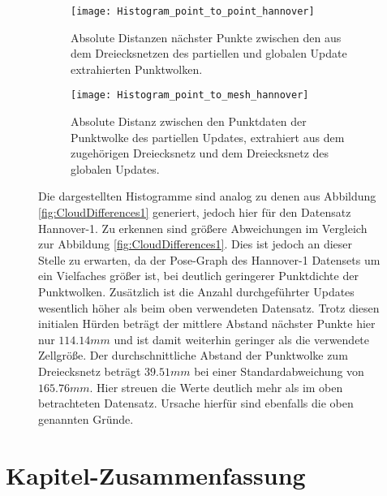\begin{figure}
	\centering
	\begin{subfigure}{.5\textwidth}
		 \centering
  		 \texttt{[image: Histogram\_point\_to\_point\_hannover]}
  		 \centering \caption{Absolute Distanzen nächster Punkte zwischen den aus dem Dreiecksnetzen des partiellen und globalen Update extrahierten Punktwolken.}
  		 \label{fig:HistogramCCphysik128_seaborn}
	\end{subfigure}%
	\begin{subfigure}{.5\textwidth}
    	\centering
  		\texttt{[image: Histogram\_point\_to\_mesh\_hannover]}
  		\centering \caption{Absolute Distanz zwischen den Punktdaten der Punktwolke des partiellen Updates, extrahiert aus dem zugehörigen Dreiecksnetz und dem Dreiecksnetz des globalen Updates.}
  		\label{fig:Histogram_point_to_mesh}
	\end{subfigure}
	\caption{Die dargestellten Histogramme sind analog zu denen aus Abbildung \ref{fig:CloudDifferences1} generiert, jedoch hier für den Datensatz Hannover-1. Zu erkennen sind größere Abweichungen im Vergleich zur Abbildung \ref{fig:CloudDifferences1}. Dies ist jedoch an dieser Stelle zu erwarten, da der Pose-Graph des Hannover-1 Datensets um ein Vielfaches größer ist, bei deutlich geringerer Punktdichte der Punktwolken. Zusätzlich ist die Anzahl durchgeführter Updates wesentlich höher als beim oben verwendeten Datensatz. Trotz diesen initialen Hürden beträgt der mittlere Abstand nächster Punkte hier nur $114.14mm$ und ist damit weiterhin geringer als die verwendete Zellgröße. Der durchschnittliche Abstand der Punktwolke zum Dreiecksnetz beträgt $39.51mm$ bei einer Standardabweichung von $165.76mm$. Hier streuen die Werte deutlich mehr als im oben betrachteten Datensatz. Ursache hierfür sind ebenfalls die oben genannten Gründe.}
	\label{fig:CloudDifferences2}
\end{figure}

\section{Kapitel-Zusammenfassung}

